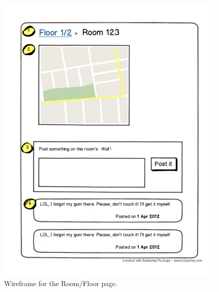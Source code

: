 \begin{figure}
                \includegraphics[scale=0.35]{img/wireframes/room.pdf}
                \caption{Wireframe for the Room/Floor page.}
                \label{img:wireframes-room}
\end{figure}
